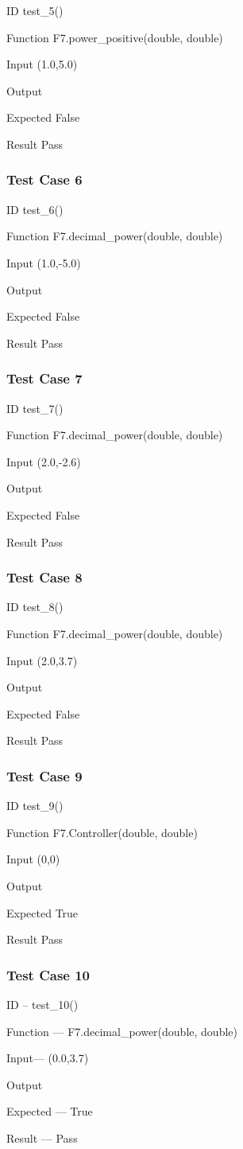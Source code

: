 \documentclass[a4paper,12pt]{article}
\begin{document}
ID  \to   test\_5()

Function \to F7.power\_positive(double, double)

Input \to (1.0,5.0)

Output 

Expected \to False

Result \to Pass



\subsubsection{\textbf{Test Case 6}}

ID \to  test\_6()

Function \to F7.decimal\_power(double, double)

Input \to (1.0,-5.0)

Output 

Expected \to False

Result \to Pass


\subsubsection{\textbf{Test Case 7}}

ID  \to   test\_7()

Function \to F7.decimal\_power(double, double)

Input \to (2.0,-2.6)

Output 

Expected \to False

Result \to Pass



\subsubsection{\textbf{Test Case 8}}

ID  \to   test\_8()

Function \to F7.decimal\_power(double, double)

Input \to (2.0,3.7)

Output 

Expected \to False

Result \to Pass


\subsubsection{\textbf{Test Case 9}}

ID  \to   test\_9()

Function \to F7.Controller(double, double)

Input \to (0,0)

Output 

Expected \to True

Result \to Pass


\subsubsection{\textbf{Test Case 10}}

ID  --   test\_10()

Function --- F7.decimal\_power(double, double)

Input--- (0.0,3.7)

Output 

Expected --- True

Result --- Pass
\end{document}
